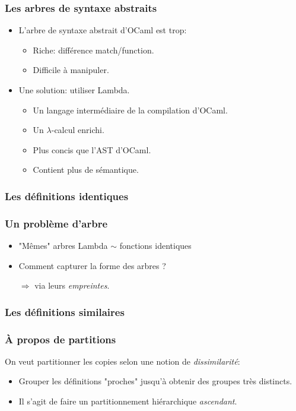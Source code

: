 \documentclass[11pt]{beamer}
\begin{document}
\begin{frame}
\frametitle{Les arbres de syntaxe abstraits}
\begin{itemize}
\item L'arbre de syntaxe abstrait d'OCaml est trop:
	\begin{itemize}
		\item Riche: différence match/function.
		\item Difficile à manipuler.
	\end{itemize}
\pause
\item Une solution: \alert{utiliser Lambda}.
	\begin{itemize}
	\item Un langage intermédiaire de la compilation d'OCaml.
	\item Un $\lambda$-calcul enrichi.
	\item Plus concis que l'AST d'OCaml.
	\item Contient plus de sémantique.
\end{itemize}
\end{itemize}
\end{frame}

\subsubsection{Les définitions identiques}
\begin{frame}
\frametitle{Un problème d'arbre}
\begin{itemize}
\item "Mêmes" arbres Lambda $\sim$ fonctions identiques
\item Comment capturer la forme des arbres ?
\pause
\item[$\Rightarrow$] via leurs \emph{empreintes}.
\end{itemize}
\end{frame}

\subsubsection{Les définitions similaires}
\begin{frame}
	\frametitle{À propos de partitions}
On veut partitionner les copies selon une notion de \emph{dissimilarité}:
\begin{itemize}
\item Grouper les définitions "proches" jusqu'à obtenir des groupes très distincts.
\item Il s'agit de faire un partitionnement hiérarchique \emph{ascendant}.
\end{itemize}
\end{frame}
\end{document}

